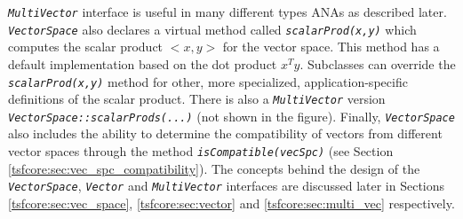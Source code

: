 \texttt{\textit{Multi\-Vector}} interface is useful in many different
types ANAs as described later. \texttt{\textit{VectorSpace}} also
declares a virtual method called
\texttt{\textit{scalarProd(x,y)}} which computes the scalar product
$<x,y>$ for the vector space. This method has a default implementation
based on the dot product $x^T y$.  Subclasses can override the
\texttt{\textit{scalarProd(x,y)}} method for other, more specialized,
application-specific definitions of the scalar product. There is also
a \texttt{\textit{Multi\-Vector}} version
\texttt{\textit{VectorSpace\-::scalarProds(...)}} (not shown in the
figure).  Finally, \texttt{\textit{VectorSpace}} also includes the
ability to determine the compatibility of vectors from different
vector spaces through the method
\texttt{\textit{isCompatible(vecSpc)}} (see Section
\ref{tsfcore:sec:vec_spc_compatibility}).  The concepts behind the design
of the \texttt{\textit{VectorSpace}},
\texttt{\textit{Vector}} and
\texttt{\textit{Multi\-Vector}} interfaces are discussed later in Sections
\ref{tsfcore:sec:vec_space}, \ref{tsfcore:sec:vector} and \ref{tsfcore:sec:multi_vec}
respectively.

